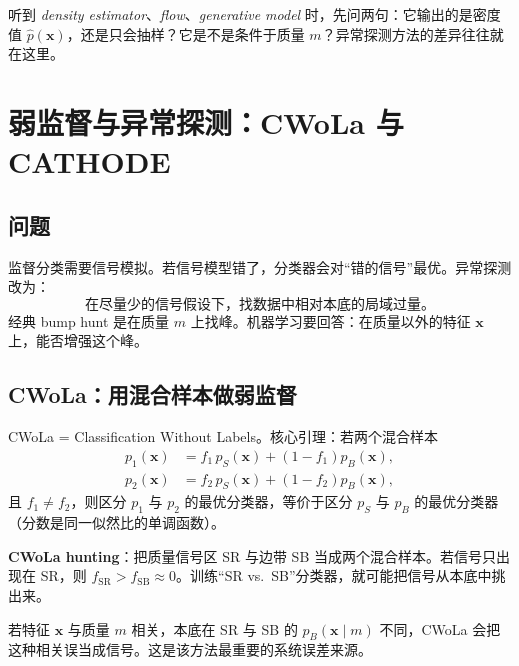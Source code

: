 \documentclass[11pt,a4paper]{article}
\theoremstyle{definition}
\theoremstyle{plain}
\theoremstyle{remark}
\begin{document}
\begin{hearbox}
听到 \emph{density estimator}、\emph{flow}、\emph{generative model} 时，先问两句：它输出的是密度值 $\hat p(\mathbf{x})$，还是只会抽样？它是不是条件于质量 $m$？异常探测方法的差异往往就在这里。
\end{hearbox}

\section{弱监督与异常探测：CWoLa 与 CATHODE}
\label{sec:anomaly}

\subsection{问题}

监督分类需要信号模拟。若信号模型错了，分类器会对``错的信号''最优。异常探测改为：
\begin{equation}
  \text{在尽量少的信号假设下，找数据中相对本底的局域过量。}
\end{equation}
经典 bump hunt 是在质量 $m$ 上找峰。机器学习要回答：在质量以外的特征 $\mathbf{x}$ 上，能否增强这个峰。

\subsection{CWoLa：用混合样本做弱监督}

CWoLa = Classification Without Labels。核心引理：若两个混合样本
\begin{align}
  p_1(\mathbf{x})&=f_1\,p_S(\mathbf{x})+(1-f_1)p_B(\mathbf{x}),\\
  p_2(\mathbf{x})&=f_2\,p_S(\mathbf{x})+(1-f_2)p_B(\mathbf{x}),
\end{align}
且 $f_1\neq f_2$，则区分 $p_1$ 与 $p_2$ 的最优分类器，等价于区分 $p_S$ 与 $p_B$ 的最优分类器（分数是同一似然比的单调函数）。

\textbf{CWoLa hunting}：把质量信号区 SR 与边带 SB 当成两个混合样本。若信号只出现在 SR，则 $f_{\mathrm{SR}}>f_{\mathrm{SB}}\approx 0$。训练``SR vs.\ SB''分类器，就可能把信号从本底中挑出来。

\begin{warnbox}
若特征 $\mathbf{x}$ 与质量 $m$ 相关，本底在 SR 与 SB 的 $p_B(\mathbf{x}\mid m)$ 不同，CWoLa 会把这种相关误当成信号。这是该方法最重要的系统误差来源。
\end{warnbox}
\end{document}
